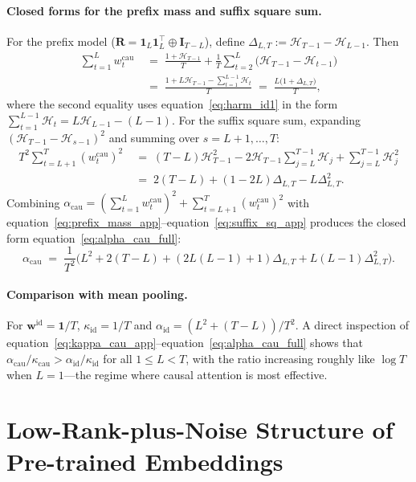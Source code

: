 \documentclass{article}
\def\eqref#1{equation~\ref{#1}}
\def\vone{{\bm{1}}}
\def\vw{{\bm{w}}}
\def\mI{{\bm{I}}}
\def\mR{{\bm{R}}}
\newcommand{\cau}{\mathrm{cau}}
\newcommand{\id}{\mathrm{id}}
\begin{document}
\paragraph{Closed forms for the prefix mass and suffix square sum.}
For the prefix model ($\mR=\vone_L\vone_L^\top\oplus\mI_{T-L}$), define $\Delta_{L,T}:=\mathcal{H}_{T-1}-\mathcal{H}_{L-1}$. Then
\begin{align}
    \sum_{t=1}^L w_t^\cau
    &\;=\; \frac{1+\mathcal{H}_{T-1}}{T} + \frac{1}{T}\sum_{t=2}^L\big(\mathcal{H}_{T-1}-\mathcal{H}_{t-1}\big) \nonumber\\
    &\;=\; \frac{1+L\mathcal{H}_{T-1}-\sum_{t=1}^{L-1}\mathcal{H}_t}{T}
    \;=\; \frac{L\big(1+\Delta_{L,T}\big)}{T}, \label{eq:prefix_mass_app}
\end{align}
where the second equality uses \eqref{eq:harm_id1} in the form $\sum_{t=1}^{L-1}\mathcal{H}_t=L\mathcal{H}_{L-1}-(L-1)$. For the suffix square sum, expanding $(\mathcal{H}_{T-1}-\mathcal{H}_{s-1})^2$ and summing over $s=L+1,\ldots,T$:
\begin{align}
    T^2\sum_{t=L+1}^T(w_t^\cau)^2
    &\;=\; (T-L)\mathcal{H}_{T-1}^2 - 2\mathcal{H}_{T-1}\!\!\sum_{j=L}^{T-1}\mathcal{H}_j + \sum_{j=L}^{T-1}\mathcal{H}_j^2 \nonumber\\
    &\;=\; 2(T-L) + (1-2L)\Delta_{L,T} - L\Delta_{L,T}^2. \label{eq:suffix_sq_app}
\end{align}
Combining $\alpha_\cau = (\sum_{t=1}^L w_t^\cau)^2 + \sum_{t=L+1}^T (w_t^\cau)^2$ with \eqref{eq:prefix_mass_app}--\eqref{eq:suffix_sq_app} produces the closed form \eqref{eq:alpha_cau_full}:
\begin{equation}\label{eq:alpha_cau_full}
    \alpha_\cau \;=\; \frac{1}{T^2}\Big(L^2 + 2(T-L) + (2L(L-1)+1)\Delta_{L,T} + L(L-1)\Delta_{L,T}^2\Big).
\end{equation}

\paragraph{Comparison with mean pooling.}
For $\vw^\id=\vone/T$, $\kappa_\id=1/T$ and $\alpha_\id=(L^2+(T-L))/T^2$. A direct inspection of \eqref{eq:kappa_cau_app}--\eqref{eq:alpha_cau_full} shows that $\alpha_\cau/\kappa_\cau>\alpha_\id/\kappa_\id$ for all $1\le L<T$, with the ratio increasing roughly like $\log T$ when $L=1$---the regime where causal attention is most effective.


\section{Low-Rank-plus-Noise Structure of Pre-trained Embeddings}\label{app:gpt2}
\end{document}
